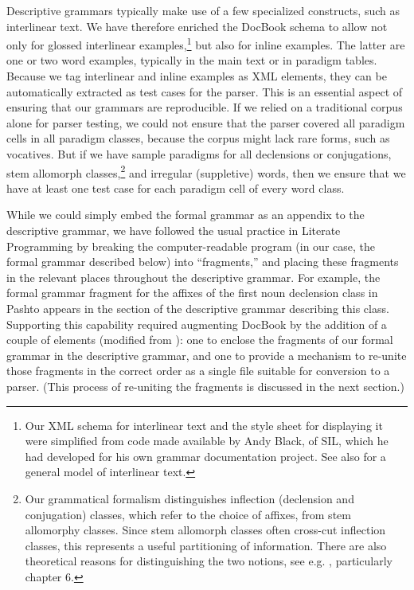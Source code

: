Descriptive grammars typically make use of a few specialized constructs, such as interlinear text. We have therefore enriched the DocBook schema to allow not only for glossed interlinear examples,\footnote{Our
  XML schema for interlinear text and the style sheet for displaying it were simplified from code made available by Andy Black, of SIL, which he had developed for his own grammar documentation project. See also \citet{HughesEtAL2003} for a general model of interlinear text.
} 
but also for inline examples. The latter are one or two word examples, typically in the main text or in paradigm tables. Because we tag interlinear and inline examples as XML elements, they can be automatically extracted as test cases for the parser. This is an essential aspect of ensuring that our grammars are reproducible. If we relied on a traditional corpus alone for parser testing, we could not ensure that the parser covered all paradigm cells in all paradigm classes, because the corpus might lack rare forms, such as vocatives. But if we have sample paradigms for all declensions or conjugations, stem allomorph classes,\footnote{Our
  grammatical formalism distinguishes inflection (declension and conjugation) classes, which refer to the choice of affixes, from stem allomorphy classes. Since stem allomorph classes often cross-cut inflection classes, this represents a useful partitioning of information. There are also theoretical reasons for distinguishing the two notions, see e.g. \citet{Carstairs1987}, particularly chapter 6.
} 
and irregular (suppletive) words, then we ensure that we have at least one test case for each paradigm cell of every word class.

While we could simply embed the formal grammar as an appendix to the descriptive grammar, we have followed the usual practice in Literate Programming by breaking the computer-readable program{ (}in our case, the formal grammar described below{) }into ``fragments,'' and placing these fragments in the relevant places throughout the descriptive grammar. For example, the formal grammar fragment for the affixes of the first noun declension class in Pashto appears in the section of the descriptive grammar describing this class. Supporting this capability required augmenting DocBook by the addition of a couple of elements (modified from \citet{Walsh2002}): one to enclose the fragments of our formal grammar in the descriptive grammar, and one to provide a mechanism to re-unite those fragments in the correct order as a single file suitable for conversion to a parser. (This process of re-uniting the fragments is discussed in the next section.)

